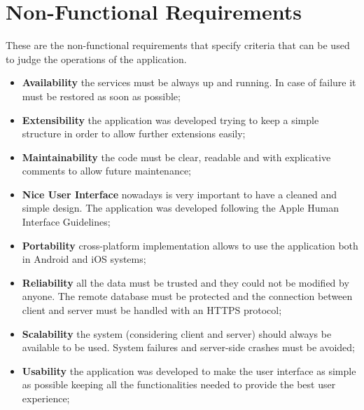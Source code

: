 \section{Non-Functional Requirements}
These are the non-functional requirements that specify criteria that can be used to judge the operations of the application.

\begin{itemize}
    \item \textbf{Availability} the services must be always up and running. In case of failure it must be restored as soon as possible;
    \item \textbf{Extensibility} the application was developed trying to keep a simple structure in order to allow further extensions easily;
    \item \textbf{Maintainability} the code must be clear, readable and with explicative comments to allow future maintenance;
    \item \textbf{Nice User Interface} nowadays is very important to have a cleaned and simple design. The application was developed following the Apple Human Interface Guidelines; 
    \item \textbf{Portability} cross-platform implementation allows to use the application both in Android and iOS systems;
    \item \textbf{Reliability} all the data must be trusted and they could not be modified by anyone. The remote database must be protected and the connection between client and server must be handled with an HTTPS protocol;
    \item \textbf{Scalability} the system (considering client and server) should always be available to be used. System failures and server-side crashes must be avoided; 
    \item \textbf{Usability} the application was developed to make the user interface as simple as possible keeping all the functionalities needed to provide the best user experience;
\end{itemize}

